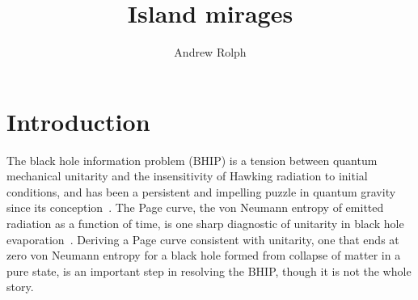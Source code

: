 \documentclass[a4paper,11pt]{article}
\title{Island mirages}
\author[a]{Andrew Rolph}
\affiliation[a]{Institute for Theoretical Physics, University of Amsterdam, 1090 GL Amsterdam, The Netherlands}
\newcommand{\cts}[1]{\ignorespaces}
\begin{document}


\maketitle
\flushbottom

\section{Introduction}
The black hole information problem (BHIP) is a tension between quantum mechanical unitarity and the insensitivity of Hawking radiation to initial conditions, and has been a persistent and impelling puzzle in quantum gravity since its conception~\cite{Hawking1975,Hawking1976}. The Page curve, the von Neumann entropy of emitted radiation as a function of time, is one sharp diagnostic of unitarity in black hole evaporation~\cite{Page1993}. Deriving a Page curve consistent with unitarity, one that ends at zero von Neumann entropy for a black hole formed from collapse of matter in a pure state, is an important step in resolving the BHIP, though it is not the whole story.  
\end{document}
